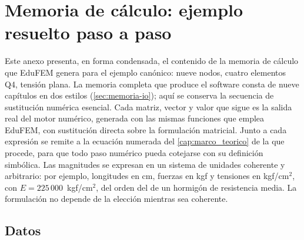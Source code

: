 

\renewcommand{\valE}{225\,000}
\renewcommand{\valDfactor}{234\,375}
\renewcommand{\Dmat}{\begin{bmatrix}
234\,375{,}00 & 46\,875{,}00 & 0{,}00 \\
46\,875{,}00 & 234\,375{,}00 & 0{,}00 \\
0{,}00 & 0{,}00 & 93\,750{,}00
\end{bmatrix}}

\chapter{Memoria de cálculo: ejemplo resuelto paso a paso}
\label{anexo:memoria}

Este anexo presenta, en forma condensada, el contenido de la memoria de cálculo que EduFEM genera para el ejemplo canónico: nueve nodos, cuatro elementos Q4, tensión plana. La memoria completa que produce el software consta de nueve capítulos en dos estilos (\autoref{sec:memoria-io}); aquí se conserva la secuencia de sustitución numérica esencial. Cada matriz, vector y valor que sigue es la salida real del motor numérico, generada con las mismas funciones que emplea EduFEM, con sustitución directa sobre la formulación matricial. Junto a cada expresión se remite a la ecuación numerada del \autoref{cap:marco_teorico} de la que procede, para que todo paso numérico pueda cotejarse con su definición simbólica. Las magnitudes se expresan en un sistema de unidades coherente y arbitrario: por ejemplo, longitudes en cm, fuerzas en kgf y tensiones en kgf/cm$^2$, con $E = \valE$~kgf/cm$^2$, del orden del de un hormigón de resistencia media. La formulación no depende de la elección mientras sea coherente.

\section{Datos}

